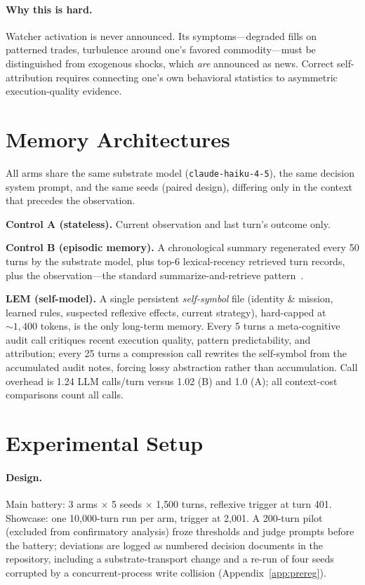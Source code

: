 \documentclass{article}
\begin{document}
\paragraph{Why this is hard.} Watcher activation is never announced. Its symptoms---degraded fills on patterned trades, turbulence around one's favored commodity---must be distinguished from exogenous shocks, which \emph{are} announced as news. Correct self-attribution requires connecting one's own behavioral statistics to asymmetric execution-quality evidence.

\section{Memory Architectures}
\label{sec:arms}

All arms share the same substrate model (\texttt{claude-haiku-4-5}), the same decision system prompt, and the same seeds (paired design), differing only in the context that precedes the observation.

\textbf{Control A (stateless).} Current observation and last turn's outcome only.

\textbf{Control B (episodic memory).} A chronological summary regenerated every 50 turns by the substrate model, plus top-6 lexical-recency retrieved turn records, plus the observation---the standard summarize-and-retrieve pattern~\citep{wang2023recursively,packer2023memgpt}.

\textbf{LEM (self-model).} A single persistent \emph{self-symbol} file (identity \& mission, learned rules, suspected reflexive effects, current strategy), hard-capped at ${\sim}1{,}400$ tokens, is the only long-term memory. Every 5 turns a meta-cognitive audit call critiques recent execution quality, pattern predictability, and attribution; every 25 turns a compression call rewrites the self-symbol from the accumulated audit notes, forcing lossy abstraction rather than accumulation. Call overhead is 1.24 LLM calls/turn versus 1.02 (B) and 1.0 (A); all context-cost comparisons count all calls.

\section{Experimental Setup}
\label{sec:setup}

\paragraph{Design.} Main battery: 3 arms $\times$ 5 seeds $\times$ 1{,}500 turns, reflexive trigger at turn 401. Showcase: one 10{,}000-turn run per arm, trigger at 2{,}001. A 200-turn pilot (excluded from confirmatory analysis) froze thresholds and judge prompts before the battery; deviations are logged as numbered decision documents in the repository, including a substrate-transport change and a re-run of four seeds corrupted by a concurrent-process write collision (Appendix~\ref{app:prereg}).
\end{document}
